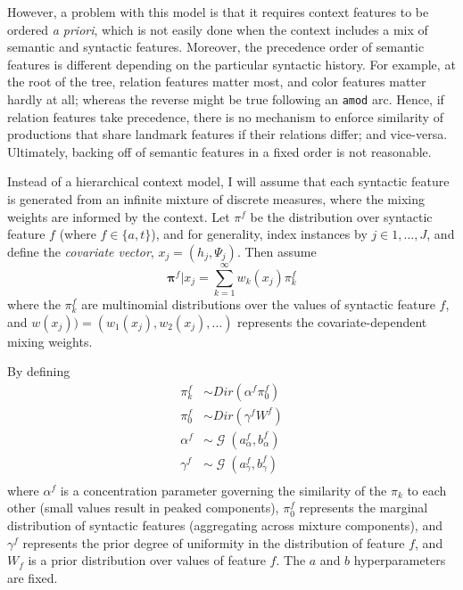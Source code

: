 \documentclass[12pt]{article}
\DeclareMathOperator{\Gamm}{\mathcal{G}}
\begin{document}
However, a problem with this model is that it requires context features to be ordered {\it a priori}, which is not easily done when the context includes a mix of semantic and syntactic features.  Moreover, the precedence order of semantic features is different depending on the particular syntactic history.  For example, at the root of the tree, relation features matter most, and color features matter hardly at all; whereas the reverse might be true following an {\tt amod} arc.  Hence, if relation features take precedence, there is no mechanism to enforce similarity of productions that share landmark features if their relations differ; and vice-versa.  Ultimately, backing off of semantic features in a fixed order is not reasonable.

Instead of a hierarchical context model, I will assume that each syntactic feature is generated from an infinite mixture of discrete measures, where the mixing weights are informed by the context.  Let $\pi^{f}$ be the distribution over syntactic feature $f$ (where $f \in \{a,t\}$), and for generality, index instances by $j \in 1, \dots, J$, and define the {\em covariate vector}, $x_{j} = (h_{j}, \Psi_j)$.  Then assume
\begin{equation}
  \label{eq:4}
  \boldsymbol{\pi}^{f} \vert x_{j} = \sum_{k=1}^\infty w_{k}(x_j) \pi^{f}_k
\end{equation}
where the $\pi^{f}_k$ are multinomial distributions over the values of syntactic feature $f$, and $w(x_j)) = (w_1(x_j), w_2(x_j), \dots)$ represents the covariate-dependent mixing weights.

By defining
\begin{align}
  \label{eq:10}
  \pi^f_k &\sim Dir(\alpha^f\pi^f_0) \\
  \pi^f_0 &\sim Dir(\gamma^f W^f) \\
  \alpha^f &\sim \Gamm(a^f_\alpha, b^f_\alpha) \\
  \gamma^f &\sim \Gamm(a^f_\gamma, b^f_\gamma) \\
\end{align}
where $\alpha^f$ is a concentration parameter governing the similarity of the $\pi_k$ to each other (small values result in peaked components), $\pi^f_0$ represents the marginal distribution of syntactic features (aggregating across mixture components), and $\gamma^f$ represents the prior degree of uniformity in the distribution of feature $f$, and $W_f$ is a prior distribution over values of feature $f$.  The $a$ and $b$ hyperparameters are fixed.
\end{document}
